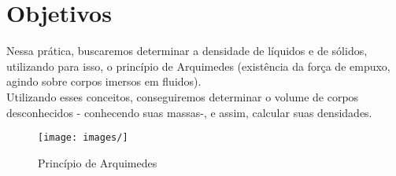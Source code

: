 \newpage
\section{Objetivos}

Nessa prática, buscaremos determinar a densidade de líquidos e de sólidos, utilizando para isso, o princípio de Arquimedes (existência da força de empuxo, agindo sobre corpos imersos em fluidos).\\
Utilizando esses conceitos, conseguiremos determinar o volume de corpos desconhecidos - conhecendo suas massas-, e assim, calcular suas densidades.  

\begin{figure}[H]
    \centering
    \texttt{[image: images/]}
    \caption{Princípio de Arquimedes}
\end{figure}